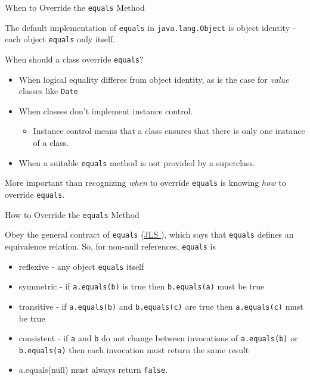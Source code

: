 \documentclass{beamer}
\begin{document}
\begin{frame}[fragile]{When to Override the {\tt equals} Method}


The default implementation of {\tt equals} in {\tt java.lang.Object} is object identity - each object {\tt equals} only itself.

When should a class override {\tt equals}?
\begin{itemize}
\item When logical equality differes from object identity, as is the case for {\it value} classes like {\tt Date}
\item When classes don't implement instance control.
  \begin{itemize}
  \item Instance control means that a class ensures that there is only one instance of a class.  
  \end{itemize}
\item When a suitable {\tt equals} method is not provided by a superclass.
\end{itemize}

More important than recognizing {\it when} to override {\tt equals} is knowing {\it how} to override {\tt equals}.
\end{frame}

\begin{frame}[fragile]{How to Override the {\tt equals} Method}


Obey the general contract of {\tt equals} (\href{}{JLS }), which says that {\tt equals} defines an equivalence relation.  So, for non-null references, {\tt equals} is
\begin{itemize}
\item reflexive - any object {\tt equals} itself
\item symmetric - if {\tt a.equals(b)} is true then {\tt b.equals(a)} must be true
\item transitive - if {\tt a.equals(b)} and {\tt b.equals(c)} are true then {\tt a.equals(c)} must be true
\item consistent - if {\tt a} and {\tt b} do not change between invocations of {\tt a.equals(b)} or {\tt b.equals(a)} then each invocation must return the same result
\item a.equals(null) must always return {\tt false}.
\end{itemize}


\end{frame}
\end{document}
